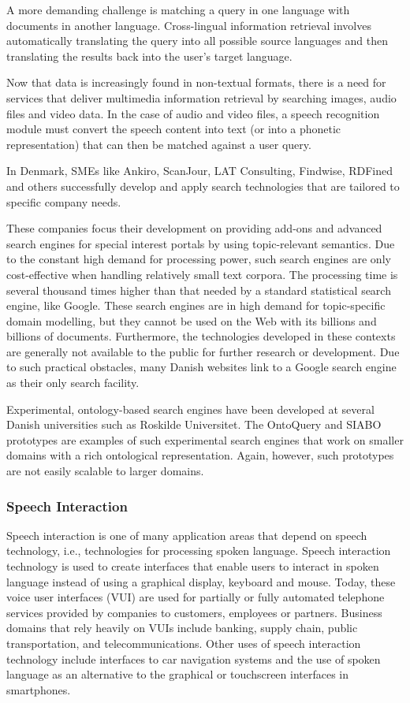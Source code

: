\begin{multicols}{2}
A more demanding challenge is matching a query in one language with documents in another language. Cross-lingual information retrieval involves automatically translating the query into all possible source languages and then translating the results back into the user's target language.

Now that data is increasingly found in non-textual formats, there is a need for services that deliver multimedia information retrieval by searching images, audio files and video data. In the case of audio and video files, a speech recognition module must convert the speech content into text (or into a phonetic representation) that can then be matched against a user query.

In Denmark, SMEs like Ankiro, ScanJour, LAT Consulting, Findwise, RDFined and others successfully develop and apply search technologies that are tailored to specific company needs.

These companies focus their development on providing add-ons and advanced search engines for special interest portals by using topic-relevant semantics. Due to the constant high demand for processing power, such search engines are only cost-effective when handling relatively small text corpora. The processing time is several thousand times higher than that needed by a standard statistical search engine, like Google. These search engines are in high demand for topic-specific domain modelling, but they cannot be used on the Web with its billions and billions of documents. Furthermore, the technologies developed in these contexts are generally not available to the public for further research or development. Due to such practical obstacles, many Danish websites link to a Google search engine as their only search facility.

Experimental, ontology-based search engines have been developed at several Danish universities such as Roskilde Universitet. The OntoQuery and SIABO prototypes are examples of such experimental search engines that work on smaller domains with a rich ontological representation.  Again, however, such prototypes are not easily scalable to larger domains.

\subsubsection{Speech Interaction}

Speech interaction is one of many application areas that depend on speech technology, i.e., technologies for processing spoken language. Speech interaction technology is used to create interfaces that enable users to interact in spoken language instead of using a graphical display, keyboard and mouse.  Today, these voice user interfaces (VUI) are used for partially or fully automated telephone services provided by companies to customers, employees or partners. Business domains that rely heavily on VUIs include banking, supply chain, public transportation, and telecommunications. Other uses of speech interaction technology include interfaces to car navigation systems and the use of spoken language as an alternative to the graphical or touchscreen interfaces in smartphones.


\end{multicols}
